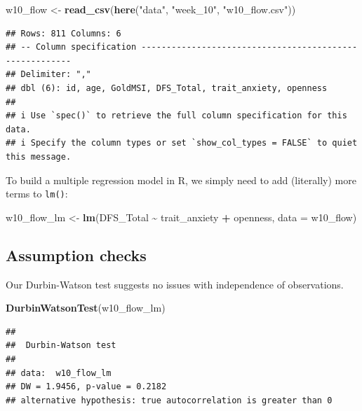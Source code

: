 \documentclass[
]{book}
\newenvironment{Shaded}{\begin{snugshade}}{\end{snugshade}}
\newcommand{\AttributeTok}[1]{\textcolor[rgb]{0.13,0.29,0.53}{#1}}
\newcommand{\FunctionTok}[1]{\textcolor[rgb]{0.13,0.29,0.53}{\textbf{#1}}}
\newcommand{\NormalTok}[1]{#1}
\newcommand{\OtherTok}[1]{\textcolor[rgb]{0.56,0.35,0.01}{#1}}
\newcommand{\SpecialCharTok}[1]{\textcolor[rgb]{0.81,0.36,0.00}{\textbf{#1}}}
\newcommand{\StringTok}[1]{\textcolor[rgb]{0.31,0.60,0.02}{#1}}
\begin{document}
\begin{Shaded}
\begin{Highlighting}[]
\NormalTok{w10\_flow }\OtherTok{\textless{}{-}} \FunctionTok{read\_csv}\NormalTok{(}\FunctionTok{here}\NormalTok{(}\StringTok{"data"}\NormalTok{, }\StringTok{"week\_10"}\NormalTok{, }\StringTok{"w10\_flow.csv"}\NormalTok{))}
\end{Highlighting}
\end{Shaded}

\begin{verbatim}
## Rows: 811 Columns: 6
## -- Column specification --------------------------------------------------------
## Delimiter: ","
## dbl (6): id, age, GoldMSI, DFS_Total, trait_anxiety, openness
## 
## i Use `spec()` to retrieve the full column specification for this data.
## i Specify the column types or set `show_col_types = FALSE` to quiet this message.
\end{verbatim}

To build a multiple regression model in R, we simply need to add (literally) more terms to \texttt{lm()}:

\begin{Shaded}
\begin{Highlighting}[]
\NormalTok{w10\_flow\_lm }\OtherTok{\textless{}{-}} \FunctionTok{lm}\NormalTok{(DFS\_Total }\SpecialCharTok{\textasciitilde{}}\NormalTok{ trait\_anxiety }\SpecialCharTok{+}\NormalTok{ openness, }\AttributeTok{data =}\NormalTok{ w10\_flow)}
\end{Highlighting}
\end{Shaded}

\subsection{Assumption checks}\label{assumption-checks-5}

Our Durbin-Watson test suggests no issues with independence of observations.

\begin{Shaded}
\begin{Highlighting}[]
\FunctionTok{DurbinWatsonTest}\NormalTok{(w10\_flow\_lm)}
\end{Highlighting}
\end{Shaded}

\begin{verbatim}
## 
##  Durbin-Watson test
## 
## data:  w10_flow_lm
## DW = 1.9456, p-value = 0.2182
## alternative hypothesis: true autocorrelation is greater than 0
\end{verbatim}
\end{document}
